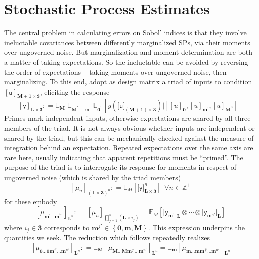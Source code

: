 \documentclass[preprint,12pt]{elsarticle}
\newcommand*{\M}[1]{\ensuremath{#1}\xspace}
\newcommand*{\x}{\times}
\newcommand*{\mi}[1]{\mathbf{#1}}
\newcommand*{\st}[1]{\mathbb{#1}}
\newcommand*{\rv}[1]{\mathsf{#1}}
\newcommand*{\te}[2][]{\left\lbrack{#2}\right\rbrack_{#1}}
\newcommand*{\tte}[2][]{\lbrack{#2}\rbrack_{#1}}
\newcommand*{\deq}{\M{\mathrel{\mathop:}=}}
\newcommand*{\ev}[3][]{\mathbb{E}_{#3}^{#1}\!\left\lbrack{#2}\right\rbrack}
\newcommand*{\evt}[3][]{\mathbb{E}_{#3}^{#1}\!#2}
\newcommand*{\set}[1]{\M{\left\lbrace{#1}\right\rbrace}}
\begin{document}
\section{Stochastic Process Estimates}\label{sec:SPEst}
    The central problem in calculating errors on Sobol' indices is that they involve ineluctable covariances between differently marginalized SPs, via their moments over ungoverned noise. But marginalization and moment determination are both a matter of taking expectations. So the ineluctable can be avoided by reversing the order of expectations -- taking moments over ungoverned noise, then marginalizing.
    To this end, adopt as design matrix a triad of inputs to condition $\te[\mi{M+1\x 3}]{\rv{u}}$, eliciting the response
    \begin{equation}\label{def:SPEst:y}
        \te[\mi{L\x 3}]{\rv{y}} \deq 
        \evt{\;\evt{\;\ev{y(\tte[\mi{(M+1)\x 3}]{\rv{u}}) 
            \big\vert \te[]{\te[\mi{0}]{u}, \te[\mi{m^{\prime}}]{u}, \te[\mi{M^{\prime\prime}}]{u}}}{\mi{0^{\prime\prime}}}}
        {\mi{M^{\prime}-m^{\prime}}}}{\mi{M}}
    \end{equation}
    Primes mark independent inputs, otherwise expectations are shared by all three members of the triad. It is not always obvious whether inputs are independent or shared by the triad, but this can be mechanically checked against the measure of integration behind an expectation. Repeated expectations over the same axis are rare here, usually indicating that apparent repetitions must be ``primed''. The purpose of the triad is to interrogate its response for moments in respect of ungoverned noise (which is shared by the triad members)
    \begin{equation}\label{def:SPEst:mu}
            \te[(\mi{L\x 3})^{n}]{\mu_{n}} \deq \ev{\tte[\mi{L\x 3}]{\rv{y}}^{n}}{M} \ \ \forall n \in \st{Z}^{+}
    \end{equation}
    for these embody
    \begin{equation*}
        \te[\mi{L}^{n}]{\mu_{\mi{m^{\prime}\ldots m}^{n\prime}}} \deq \te[\prod_{j=1}^{n}(\mi{L\x}i_{j})]{\mu_{n}} = \ev{\tte[\mi{L}]{\rv{y}_{\mi{m}^{\prime}}}\otimes\cdots\otimes\tte[\mi{L}]{\rv{y}_{\mi{m}^{n\prime}}}}{M}
    \end{equation*}
    where $i_{j}\in \mi{3}$ corresponds to $\mi{m}^{j\prime} \in \set{\mi{0},\mi{m},\mi{M}}$. This expression underpins the quantities we seek. The reduction which follows repeatedly realizes
    \begin{equation}\label{eq:SPEstimates:reduction}
        \te[\mi{L}^{n}]{\mu_{\mi{0\ldots 0}\mi{m}^{j\prime}\mi{\ldots m}^{n\prime}}} \deq 
        \evt{\te[\mi{L}^{n}]{\mu_{\mi{M\ldots M}\mi{m}^{j\prime}\mi{\ldots m}^{n\prime}}}}{\mi{M}} = 
        \evt{\te[\mi{L}^{n}]{\mu_{\mi{m\ldots m}\mi{m}^{j\prime}\mi{\ldots m}^{n\prime}}}}{\mi{m}}
    \end{equation}
\end{document}
